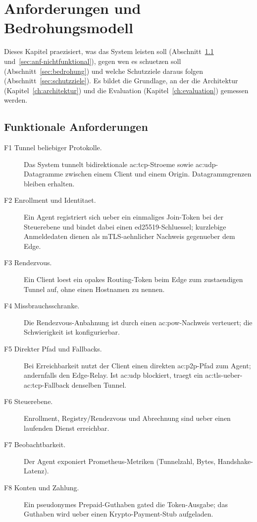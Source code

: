 \chapter{Anforderungen und Bedrohungsmodell}
\label{ch:anforderungen}

Dieses Kapitel praezisiert, was das System leisten soll
(Abschnitt~\ref{sec:anf-funktional} und~\ref{sec:anf-nichtfunktional}), gegen
wen es schuetzen soll (Abschnitt~\ref{sec:bedrohung}) und welche Schutzziele
daraus folgen (Abschnitt~\ref{sec:schutzziele}). Es bildet die Grundlage, an der
die Architektur (Kapitel~\ref{ch:architektur}) und die Evaluation
(Kapitel~\ref{ch:evaluation}) gemessen
werden.

\section{Funktionale Anforderungen}
\label{sec:anf-funktional}

\begin{description}
  \item[F1 Tunnel beliebiger Protokolle.] Das System tunnelt bidirektionale
    \gls{ac:tcp}-Stroeme sowie \gls{ac:udp}-Datagramme zwischen einem Client und
    einem Origin. Datagrammgrenzen bleiben erhalten.
  \item[F2 Enrollment und Identitaet.] Ein Agent registriert sich ueber ein
    einmaliges Join-Token bei der Steuerebene und bindet dabei einen
    ed25519-Schluessel; kurzlebige Anmeldedaten dienen als mTLS-aehnlicher
    Nachweis gegenueber dem Edge.
  \item[F3 Rendezvous.] Ein Client loest ein opakes Routing-Token beim Edge zum
    zustaendigen Tunnel auf, ohne einen Hostnamen zu nennen.
  \item[F4 Missbrauchsschranke.] Die Rendezvous-Anbahnung ist durch einen
    \gls{ac:pow}-Nachweis verteuert; die Schwierigkeit ist konfigurierbar.
  \item[F5 Direkter Pfad und Fallbacks.] Bei Erreichbarkeit nutzt der Client
    einen direkten \gls{ac:p2p}-Pfad zum Agent; andernfalls den Edge-Relay. Ist
    \gls{ac:udp} blockiert, traegt ein \gls{ac:tls}-ueber-\gls{ac:tcp}-Fallback
    denselben Tunnel.
  \item[F6 Steuerebene.] Enrollment, Registry/Rendezvous und Abrechnung sind
    ueber einen laufenden Dienst erreichbar.
  \item[F7 Beobachtbarkeit.] Der Agent exponiert Prometheus-Metriken
    (Tunnelzahl, Bytes, Handshake-Latenz).
  \item[F8 Konten und Zahlung.] Ein pseudonymes Prepaid-Guthaben gated die
    Token-Ausgabe; das Guthaben wird ueber einen Krypto-Payment-Stub aufgeladen.
\end{description}

